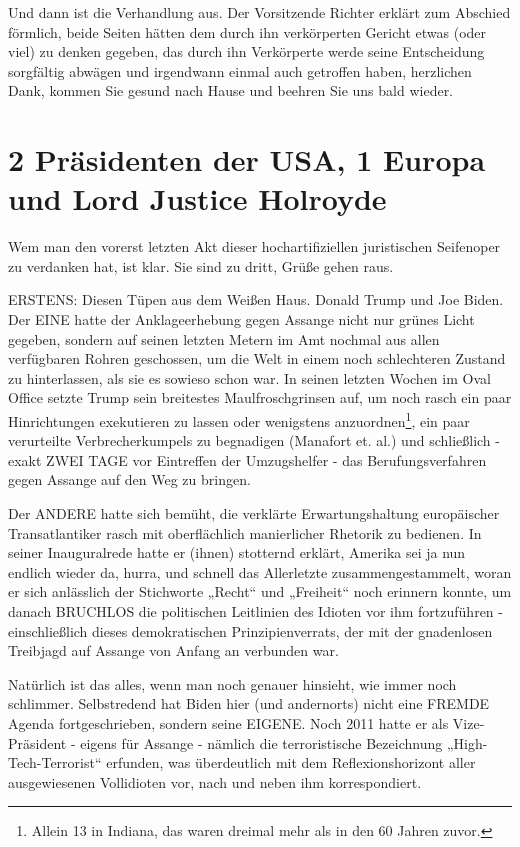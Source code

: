 \begin{multicols}{2}
Und dann ist die Verhandlung aus. Der Vorsitzende Richter erklärt zum Abschied förmlich, beide Seiten hätten
dem durch ihn verkörperten Gericht etwas (oder viel) zu
denken gegeben, das durch ihn Verkörperte werde seine
Entscheidung sorgfältig abwägen und irgendwann einmal auch getroffen haben, herzlichen Dank, kommen
Sie gesund nach Hause und beehren Sie uns bald wieder.



\chapter{2 Präsidenten der USA, 1 Europa und Lord Justice Holroyde} %

Wem man den vorerst letzten Akt dieser hochartifiziellen juristischen Seifenoper zu verdanken hat, ist klar. Sie
sind zu dritt, Grüße gehen raus.

ERSTENS: Diesen Tüpen aus dem Weißen Haus. Donald
Trump und Joe Biden. Der EINE hatte der Anklageerhebung gegen Assange nicht nur grünes Licht gegeben,
sondern auf seinen letzten Metern im Amt nochmal aus
allen verfügbaren Rohren geschossen, um die Welt in einem noch schlechteren Zustand zu hinterlassen, als sie
es sowieso schon war. In seinen letzten Wochen im Oval
Office setzte Trump sein breitestes Maulfroschgrinsen
auf, um noch rasch ein paar Hinrichtungen exekutieren
zu lassen oder wenigstens 
anzuordnen\footnote[22]{Allein 13 in Indiana, das waren dreimal mehr als in den 60 Jahren zuvor.}, 
ein paar verurteilte Verbrecherkumpels zu begnadigen (Manafort et.
al.) und schließlich - exakt ZWEI TAGE vor Eintreffen der
Umzugshelfer - das Berufungsverfahren gegen Assange
auf den Weg zu bringen.

Der ANDERE hatte sich bemüht, die verklärte Erwartungshaltung europäischer Transatlantiker rasch mit
oberflächlich manierlicher Rhetorik zu bedienen. In
seiner Inauguralrede hatte er (ihnen) stotternd erklärt,
Amerika sei ja nun endlich wieder da, hurra, und schnell
das Allerletzte zusammengestammelt, woran er sich anlässlich der Stichworte „Recht“ und „Freiheit“ noch erinnern konnte, um danach BRUCHLOS die politischen
Leitlinien des Idioten vor ihm fortzuführen - einschließlich dieses demokratischen Prinzipienverrats, der mit
der gnadenlosen Treibjagd auf Assange von Anfang an verbunden war.

Natürlich ist das alles, wenn man noch genauer hinsieht,
wie immer noch schlimmer. Selbstredend hat Biden
hier (und andernorts) nicht eine FREMDE Agenda fortgeschrieben, sondern seine EIGENE. Noch 2011 hatte
er als Vize-Präsident - eigens für Assange - nämlich die
terroristische Bezeichnung „High-Tech-Terrorist“ erfunden, was überdeutlich mit dem Reflexionshorizont aller
ausgewiesenen Vollidioten vor, nach und neben ihm
korrespondiert.


\end{multicols}
